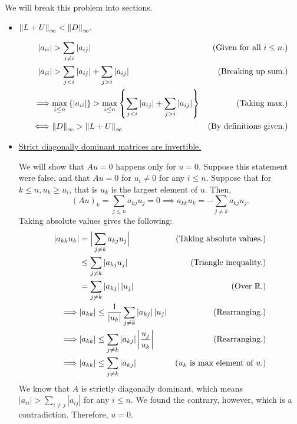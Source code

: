 \begin{solution}

    We will break this problem into sections.
    \begin{itemize}[-]
        \item \underline{$\norm{L + U}_\infty < \norm{D}_\infty.$}

        \jump
        \tightalignbreak
        \begin{align*}
            |a_{ii}| &> \sum_{j \neq i} |a_{ij}| &\text{(Given for all $ i \leq n$.)}\\
            |a_{ii}| &> \sum_{j < i} |a_{ij}| + \sum_{j > i} |a_{ij}| &\text{(Breaking up sum.)}\\
            \implies &\underset{i \leq n}{\max} \left\{ |a_{ii}| \right\} > \underset{i \leq n}{\max} \left \{ \sum_{j < i} |a_{ij}| + \sum_{j > i} |a_{ij}| \right\} &\text{(Taking max.)}\\
            \iff & \norm{D}_\infty > \norm{L + U}_{\infty} &\text{(By definitions given.)}
        \end{align*}
        \vspace{-6mm}\alignbreak
        
        \item \underline{Strict diagonally dominant matrices are invertible.}

        \jump
        We will show that $Au = 0$ happens only for $u = 0$. Suppose this statement were false, and that $Au = 0$ for $u_i \neq 0$ for any $i \leq n$. Suppose that for $k \leq n, u_k \geq u_i$, that is $u_k$ is the largest element of $u$. Then,
        \[ (Au)_k = \sum_{j \leq n} a_{kj}u_j = 0 \implies  a_{kk}u_k = -\sum_{j \neq k} a_{kj}u_j.\]
        Taking absolute values gives the following:
        \tightalignbreak
        \begin{align*}
        |a_{kk}u_k| &= \Big| \sum_{j \neq k} a_{kj}u_j\Big| &\text{(Taking absolute values.)}\\
        &\leq \sum_{j \neq k}\left| a_{kj} u_j\right| &\text{(Triangle inequality.)}\\
        &= \sum_{j \neq k}\left| a_{kj} \right| \left|u_j\right| &\text{(Over $\mathbb{R}$.)}\\
        \implies & |a_{kk}| \leq \frac{1}{|u_k|}\sum_{j \neq k}\left| a_{kj} \right| \left|u_j\right| &\text{(Rearranging.)}\\
        \implies & |a_{kk}| \leq \sum_{j \neq k}\left| a_{kj} \right| \left|\frac{u_j}{u_k}\right| &\text{(Rearranging.)}\\
        \implies & |a_{kk}| \leq \sum_{j \neq k}\left| a_{kj} \right| &\text{($u_k$ is max element of $u$.)}
        \end{align*}
        We know that $A$ is strictly diagonally dominant, which means $|a_{ii}| > \sum_{i \neq j} |a_{ij}|$ for any $i \leq n$. We found the contrary, however, which is a contradiction. Therefore, $u = 0$.
    \end{itemize}
\end{solution}
